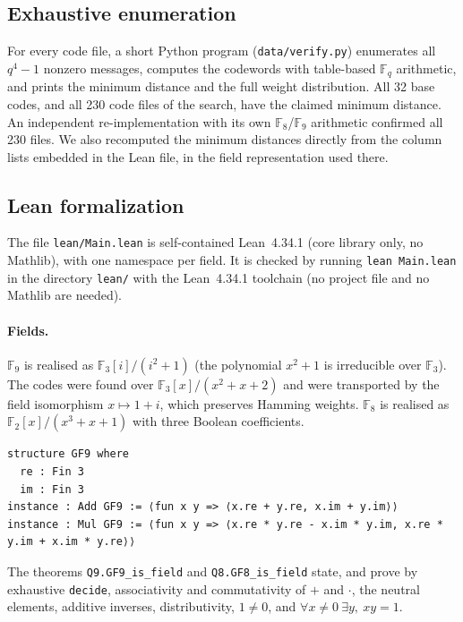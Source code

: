 \documentclass[11pt]{article}
\numberwithin{equation}{section}
\theoremstyle{definition}
\theoremstyle{remark}
\newcommand{\F}{\mathbb F}
\begin{document}
\subsection{Exhaustive enumeration}
For every code file, a short Python program (\texttt{data/verify.py}) enumerates all $q^4-1$ nonzero
messages, computes the codewords with table-based $\F_q$ arithmetic, and prints the minimum distance
and the full weight distribution. All 32 base codes, and all 230 code files of the search, have the
claimed minimum distance. An independent re-implementation with its own $\F_8$/$\F_9$ arithmetic
confirmed all 230 files. We also recomputed the minimum distances directly from the column lists
embedded in the Lean file, in the field representation used there.

\subsection{Lean formalization}
The file \texttt{lean/Main.lean} is self-contained Lean~4.34.1 (core library only, no Mathlib), with
one namespace per field. It is checked by running \texttt{lean Main.lean} in the directory
\texttt{lean/} with the Lean~4.34.1 toolchain (no project file and no Mathlib are needed).

\paragraph{Fields.} $\F_9$ is realised as $\F_3[i]/(i^2+1)$ (the polynomial $x^2+1$ is irreducible over
$\F_3$). The codes were found over $\F_3[x]/(x^2+x+2)$ and were transported by the field isomorphism
$x\mapsto 1+i$, which preserves Hamming weights. $\F_8$ is realised as $\F_2[x]/(x^3+x+1)$ with three
Boolean coefficients.
\begin{lstlisting}
structure GF9 where
  re : Fin 3
  im : Fin 3
instance : Add GF9 := ⟨fun x y => ⟨x.re + y.re, x.im + y.im⟩⟩
instance : Mul GF9 := ⟨fun x y => ⟨x.re * y.re - x.im * y.im, x.re * y.im + x.im * y.re⟩⟩
\end{lstlisting}
The theorems \texttt{Q9.GF9\_is\_field} and \texttt{Q8.GF8\_is\_field} state, and prove by exhaustive
\texttt{decide}, associativity and commutativity of $+$ and $\cdot$, the neutral elements, additive
inverses, distributivity, $1\ne0$, and $\forall x\ne0\ \exists y,\ xy=1$.
\end{document}
